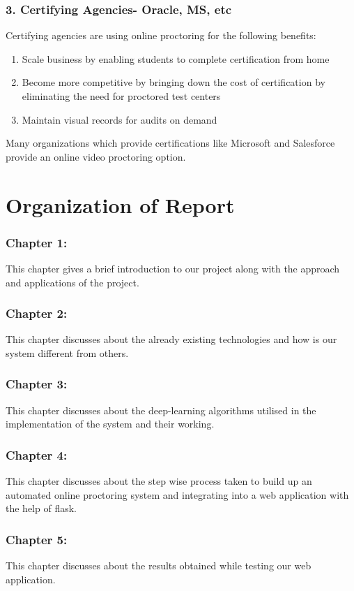 \documentclass[12pt]{report}
\begin{document}
\subsubsection{3. Certifying Agencies- Oracle, MS, etc}
Certifying agencies are using online proctoring for the following benefits:
\begin{enumerate}
\item Scale business by enabling students to complete certification from home
\item Become more competitive by bringing down the cost of certification by eliminating the need for proctored test centers
\item Maintain visual records for audits on demand
\end{enumerate}
Many organizations which provide certifications like Microsoft and Salesforce provide an online video proctoring option.
\section{Organization of Report}
\subsubsection{Chapter 1:}
This chapter gives a brief introduction to our project along with the approach and applications of the project.
\subsubsection{Chapter 2:} This chapter discusses about the already existing technologies and how is our system different from others. 
\subsubsection{Chapter 3: } This chapter discusses about the deep-learning algorithms utilised in the implementation of the system and their working.
\subsubsection{Chapter 4:}  This chapter discusses about the step wise process taken to build up an automated online proctoring system and integrating into a web application with the help of flask.
\subsubsection{Chapter 5:} This chapter discusses about the results obtained while testing our web application.
\end{document}
